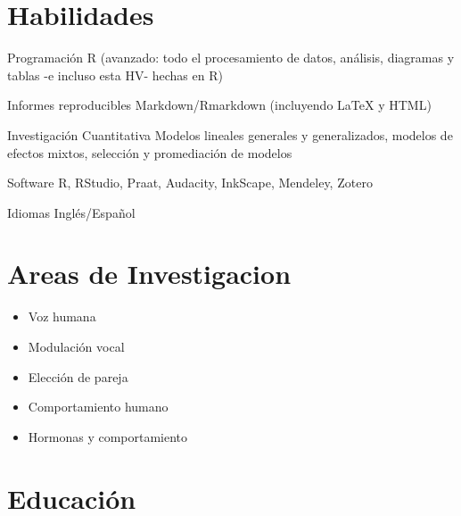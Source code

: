 \documentclass[11pt, a4paper]{awesome-cv}
\providecommand{\tightlist}{%
	\setlength{\itemsep}{0pt}\setlength{\parskip}{0pt}}
\begin{document}
\hypertarget{habilidades}{%
\section{Habilidades}\label{habilidades}}

\begin{cvskills}
  \cvskill
    {Programación}
    {R (avanzado: todo el procesamiento de datos, análisis, diagramas y tablas -e incluso esta HV- hechas en R)}

  \cvskill
    {Informes reproducibles}
    {Markdown/Rmarkdown (incluyendo {\selectfont\LaTeX} y HTML)}

  \cvskill
    {Investigación Cuantitativa}
    {Modelos lineales generales y generalizados, modelos de efectos mixtos, selección y promediación de modelos}

  \cvskill
    {Software}
    {R, RStudio, Praat, Audacity, InkScape, Mendeley, Zotero}

  \cvskill
    {Idiomas}
    {Inglés/Español}
\end{cvskills}

\hypertarget{areas-de-investigacion}{%
\section{Areas de Investigacion}\label{areas-de-investigacion}}

\begin{itemize}
\tightlist
\item
  Voz humana
\item
  Modulación vocal
\item
  Elección de pareja
\item
  Comportamiento humano
\item
  Hormonas y comportamiento
\end{itemize}

\hypertarget{educaciuxf3n}{%
\section{Educación}\label{educaciuxf3n}}
\end{document}
